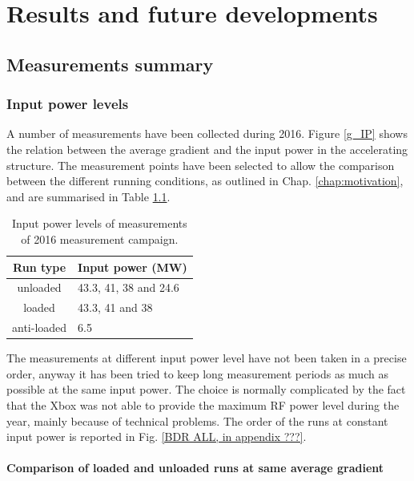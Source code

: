 \chapter[Results and future developments]{Results and future developments}

\section[Measurements summary]{Measurements summary}

\subsection[Input power levels]{Input power levels}

A number of measurements have been collected during 2016. Figure \ref{g_IP} shows the relation between the average gradient and the input power in the accelerating structure. The measurement points have been selected to allow the comparison between the different running conditions, as outlined in Chap. \ref{chap:motivation}, and are summarised in Table \ref{run_pwr}.

\begin{table}
  \centering
    \begin{tabular}{ c l }
    \hline
    \hline
    Run type		&	Input power (MW)		\\
    \hline
    unloaded 		&	43.3, 41, 38 and 24.6	\\
    loaded			&	43.3, 41 and 38			\\
    anti-loaded		&	6.5					\\
    \hline
    \hline
    \end{tabular}
\caption{Input power levels of measurements of 2016 measurement campaign.}
\label{run_pwr}
\end{table}

The measurements at different input power level have not been taken in a precise order, anyway it has been tried to keep long measurement periods as much as possible at the same input power. 
The choice is normally complicated by the fact that the Xbox was not able to provide the maximum RF power level during the year, mainly because of technical problems. The order of the runs at constant input power is reported in Fig. \ref{BDR ALL, in appendix ???}.


\subsubsection{Comparison of loaded and unloaded runs at same average gradient}

